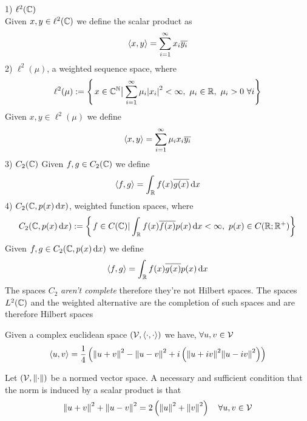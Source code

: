\documentclass[../complete.tex]{subfiles}
\begin{document}
\begin{eg}
	1) $\ell^2(\mathbb{C})$\\
	Given $x,y\in\ell^2(\mathbb{C})$ we define the scalar product as
	\begin{equation*}
		\langle x, y \rangle=\sum_{i=1}^\infty x_i\overline{y_i}
	\end{equation*}
	2) $\ell^2(\mu)$, a weighted sequence space, where
	\begin{equation*}
		\ell^2(\mu):=\left\{ \derin{x\in\Cf^\N}\sum_{i=1}^\infty\mu_i\abs{x_i}^2<\infty,\ \mu_i\in\R,\ \mu_i>0\ \forall i \right\}
	\end{equation*}
	Given $x,y\in\ell^2(\mu)$ we define
	\begin{equation*}
		\langle x, y \rangle=\sum_{i=1}^\infty\mu_ix_i\overline{y_i}
	\end{equation*}
	3) $C_2(\mathbb{C})$
	Given $f,g\in C_2(\mathbb{C})$ we define
	\begin{equation*}
		\langle f, g \rangle=\int_{\mathbb{R}} f(x)\overline{g(x)}\operatorname{d\!} x
	\end{equation*}
	4) $C_2(\mathbb{C},p(x)\operatorname{d\!} x)$, weighted function spaces, where
	\begin{equation*}
		C_2(\mathbb{C},p(x)\operatorname{d\!} x):=\left\{ \left.f\in C(\mathbb{C})\right|_{}\int_{\mathbb{R}} f(x)\overline{f(x)}p(x)\operatorname{d\!} x<\infty,\ p(x)\in C(\mathbb{R};\mathbb{R}^+) \right\}
	\end{equation*}
	Given $f,g\in C_2(\mathbb{C},p(x)\operatorname{d\!} x)$ we define
	\begin{equation*}
		\langle f, g \rangle=\int_{\mathbb{R}} f(x)\overline{g(x)}p(x)\operatorname{d\!} x
	\end{equation*}
	The spaces $C_2$ \emph{aren't complete} therefore they're not Hilbert spaces. The spaces $L^2(\mathbb{C})$ and the weighted alternative are the completion of such spaces and are therefore Hilbert spaces
\end{eg}
\begin{thm}
	Given a complex euclidean space $(\mathcal{V},\langle \cdot, \cdot \rangle)$ we have, $\forall u,v\in\mathcal{V}$
	\begin{equation}
		\langle u, v \rangle=\frac{1}{4}\left( \norm{u+v}^2-\norm{u-v}^2+i\left( \norm{u+iv}^2\norm{u-iv}^2 \right) \right)
		\label{eq:polarizationid}
	\end{equation}
\end{thm}
\begin{thm}
	Let $(\mathcal{V},\norm{\cdot})$ be a normed vector space. A necessary and sufficient condition that the norm is induced by a scalar product is that
	\begin{equation}
		\norm{u+v}^2+\norm{u-v}^2=2\left( \norm{u}^2+\norm{v}^2 \right)\quad\forall u,v\in\mathcal{V}
		\label{eq:parallelogramrule}
	\end{equation}
\end{thm}
\end{document}
